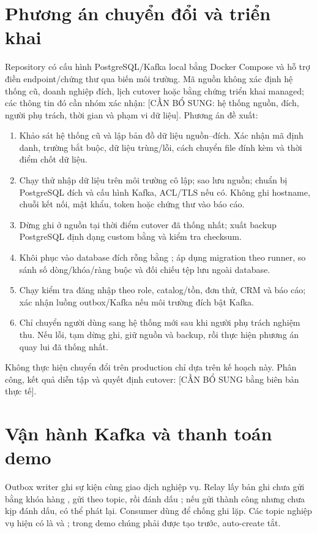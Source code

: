 \section{Phương án chuyển đổi và triển khai}
Repository có cấu hình PostgreSQL/Kafka local bằng Docker Compose và hỗ trợ điền endpoint/chứng thư qua biến môi trường. Mã nguồn không xác định hệ thống cũ, doanh nghiệp đích, lịch cutover hoặc bằng chứng triển khai managed; các thông tin đó cần nhóm xác nhận: [CẦN BỔ SUNG: hệ thống nguồn, đích, người phụ trách, thời gian và phạm vi dữ liệu]. Phương án đề xuất:
\begin{enumerate}
\item Khảo sát hệ thống cũ và lập bản đồ dữ liệu nguồn--đích. Xác nhận mã định danh, trường bắt buộc, dữ liệu trùng/lỗi, cách chuyển file đính kèm và thời điểm chốt dữ liệu.
\item Chạy thử nhập dữ liệu trên môi trường cô lập; sao lưu nguồn; chuẩn bị PostgreSQL đích và cấu hình Kafka, ACL/TLS nếu có. Không ghi hostname, chuỗi kết nối, mật khẩu, token hoặc chứng thư vào báo cáo.
\item Dừng ghi ở nguồn tại thời điểm cutover đã thống nhất; xuất backup PostgreSQL định dạng custom bằng \texttt{} và kiểm tra checksum.
\item Khôi phục vào database đích rỗng bằng \texttt{}; áp dụng migration theo runner, so sánh số dòng/khóa/ràng buộc và đối chiếu tệp lưu ngoài database.
\item Chạy kiểm tra đăng nhập theo role, catalog/tồn, đơn thử, CRM và báo cáo; xác nhận luồng outbox/Kafka nếu môi trường đích bật Kafka.
\item Chỉ chuyển người dùng sang hệ thống mới sau khi người phụ trách nghiệm thu. Nếu lỗi, tạm dừng ghi, giữ nguồn và backup, rồi thực hiện phương án quay lui đã thống nhất.
\end{enumerate}
Không thực hiện chuyển đổi trên production chỉ dựa trên kế hoạch này. Phân công, kết quả diễn tập và quyết định cutover: [CẦN BỔ SUNG bằng biên bản thực tế].

\section{Vận hành Kafka và thanh toán demo}
Outbox writer ghi sự kiện cùng giao dịch nghiệp vụ. Relay lấy bản ghi chưa gửi bằng khóa hàng \texttt{}, gửi theo topic, rồi đánh dấu \texttt{}; nếu gửi thành công nhưng chưa kịp đánh dấu, có thể phát lại. Consumer dùng \texttt{} để chống ghi lặp. Các topic nghiệp vụ hiện có là \texttt{} và \texttt{}; trong demo chúng phải được tạo trước, auto-create tắt.

